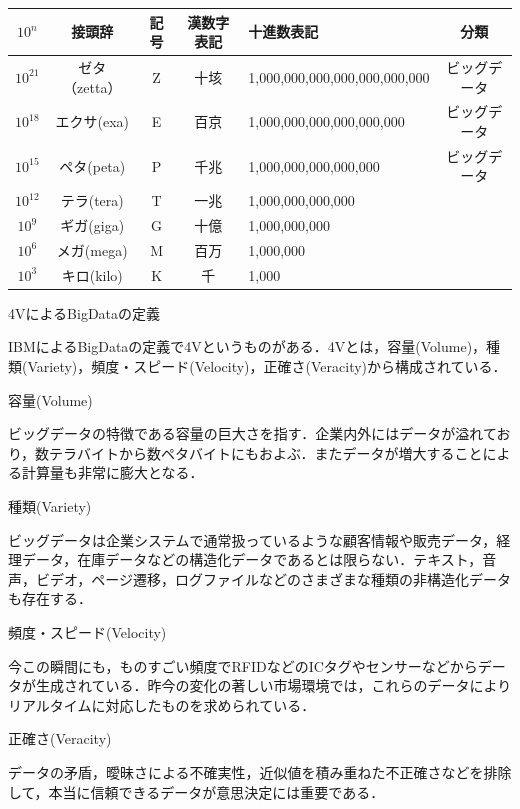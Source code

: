 \begin{table}[H]
  \begin{tabular}{|c|c|c|c|l|c|} \hline
    $10^n$ & 接頭辞 & 記号 & 漢数字表記 & 十進数表記 & 分類 \\ \hline
    $10^21$ & ゼタ（zetta） & Z & 十垓 & 1,000,000,000,000,000,000,000 & ビッグデータ \\ \hline
    $10^18$ & エクサ(exa) & E & 百京 & 1,000,000,000,000,000,000 & ビッグデータ \\ \hline
    $10^15$ & ペタ(peta) & P & 千兆 & 1,000,000,000,000,000 & ビッグデータ \\ \hline
    $10^12$ & テラ(tera) & T & 一兆 & 1,000,000,000,000 &  \\ \hline
    $10^9$ & ギガ(giga) & G & 十億 & 1,000,000,000 &  \\ \hline
    $10^6$ & メガ(mega) & M & 百万 & 1,000,000 &  \\ \hline
    $10^3$ & キロ(kilo) & K & 千 & 1,000 &  \\ \hline
  \end{tabular}
\end{table}




4VによるBigDataの定義

IBMによるBigDataの定義で4Vというものがある．4Vとは，容量(Volume)，種類(Variety)，頻度・スピード(Velocity)，正確さ(Veracity)から構成されている．



容量(Volume)

ビッグデータの特徴である容量の巨大さを指す．企業内外にはデータが溢れており，数テラバイトから数ペタバイトにもおよぶ．またデータが増大することによる計算量も非常に膨大となる．



種類(Variety)

ビッグデータは企業システムで通常扱っているような顧客情報や販売データ，経理データ，在庫データなどの構造化データであるとは限らない．テキスト，音声，ビデオ，ページ遷移，ログファイルなどのさまざまな種類の非構造化データも存在する．



頻度・スピード(Velocity)

今この瞬間にも，ものすごい頻度でRFIDなどのICタグやセンサーなどからデータが生成されている．昨今の変化の著しい市場環境では，これらのデータによりリアルタイムに対応したものを求められている．



正確さ(Veracity)

データの矛盾，曖昧さによる不確実性，近似値を積み重ねた不正確さなどを排除して，本当に信頼できるデータが意思決定には重要である．



